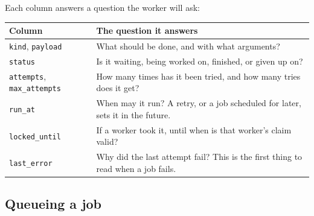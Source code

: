\noindent{}Each column answers a question the worker will ask:


{\def\LTcaptype{none} %
\begin{longtable}[]{@{}
  >{\raggedright\arraybackslash}p{}
  >{\raggedright\arraybackslash}p{}@{}}
\toprule\noalign{}
\begin{minipage}[b]{\linewidth}\raggedright
Column
\end{minipage} & \begin{minipage}[b]{\linewidth}\raggedright
The question it answers
\end{minipage} \\
\midrule\noalign{}
\endhead
\bottomrule\noalign{}
\endlastfoot
\texttt{kind}, \texttt{payload} & What should be done, and with what arguments? \\
\texttt{status} & Is it waiting, being worked on, finished, or given up on? \\
\texttt{attempts}, \texttt{max\_attempts} & How many times has it been tried, and how many tries does it get? \\
\texttt{run\_at} & When may it run? A retry, or a job scheduled for later, sets it in the future. \\
\texttt{locked\_until} & If a worker took it, until when is that worker's claim valid? \\
\texttt{last\_error} & Why did the last attempt fail? This is the first thing to read when a job fails. \\
\end{longtable}
}

\subsection*{Queueing a job}\label{41-event-driven-architecture:queueing-a-job}

